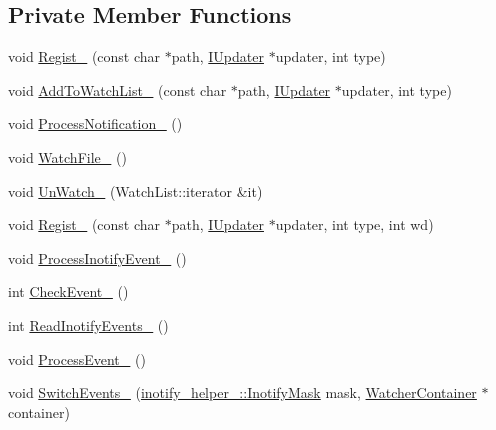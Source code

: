 \subsection*{Private Member Functions}
\begin{DoxyCompactItemize}
\item 
void \hyperlink{classmocha_1_1_file_watcher_1_1_ptr_impl_ae39d4963230278c98c88f94ca5aec162}{Regist\_\-} (const char $\ast$path, \hyperlink{classmocha_1_1_i_updater}{IUpdater} $\ast$updater, int type)
\item 
void \hyperlink{classmocha_1_1_file_watcher_1_1_ptr_impl_a7ab8af718b82f2544d8e5366422a05b5}{AddToWatchList\_\-} (const char $\ast$path, \hyperlink{classmocha_1_1_i_updater}{IUpdater} $\ast$updater, int type)
\item 
void \hyperlink{classmocha_1_1_file_watcher_1_1_ptr_impl_a8f75c9f3652efde78f973f5a8d1fbfd2}{ProcessNotification\_\-} ()
\item 
void \hyperlink{classmocha_1_1_file_watcher_1_1_ptr_impl_a70d99d205c0011dababa26b69c6ca446}{WatchFile\_\-} ()
\item 
void \hyperlink{classmocha_1_1_file_watcher_1_1_ptr_impl_a81fd5abc62a78c114f71b4ea3271b0a3}{UnWatch\_\-} (WatchList::iterator \&it)
\item 
void \hyperlink{classmocha_1_1_file_watcher_1_1_ptr_impl_a85cbc5de94605c56b740f935146c57da}{Regist\_\-} (const char $\ast$path, \hyperlink{classmocha_1_1_i_updater}{IUpdater} $\ast$updater, int type, int wd)
\item 
void \hyperlink{classmocha_1_1_file_watcher_1_1_ptr_impl_a719edb9752ddfdb182434ee472292892}{ProcessInotifyEvent\_\-} ()
\item 
int \hyperlink{classmocha_1_1_file_watcher_1_1_ptr_impl_a9f3abaf80fb4e4c6a5d7f929890a472a}{CheckEvent\_\-} ()
\item 
int \hyperlink{classmocha_1_1_file_watcher_1_1_ptr_impl_ae1b45a4b82aed3c3b64c7e410032f52f}{ReadInotifyEvents\_\-} ()
\item 
void \hyperlink{classmocha_1_1_file_watcher_1_1_ptr_impl_aa76b00b2b18690d29d62c8512936b5fc}{ProcessEvent\_\-} ()
\item 
void \hyperlink{classmocha_1_1_file_watcher_1_1_ptr_impl_ae9c44a310e24ada2113d324e2fb4e9c4}{SwitchEvents\_\-} (\hyperlink{namespacemocha_1_1inotify__helper___aa8d25eea9099a062f693484523e0d508}{inotify\_\-helper\_\-::InotifyMask} mask, \hyperlink{classmocha_1_1_watcher_container}{WatcherContainer} $\ast$container)
\end{DoxyCompactItemize}
